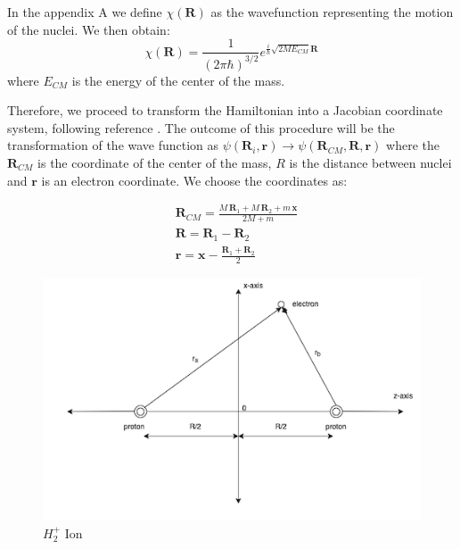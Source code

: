 In the appendix A we define $ \chi(\mathbf{R}) $ as the wavefunction representing the motion of the nuclei. We then  obtain:
\begin{equation}
\chi(\mathbf{R}) = \frac{1}{(2\pi\hbar)^{3/2}}e^{\frac{i}{\hbar}\sqrt{2ME_{CM}}\mathbf{R}}
\end{equation}
where $ E_{CM} $ is the energy of the center of the mass.

Therefore, we proceed to transform the Hamiltonian into a Jacobian coordinate system, following reference \cite{ZygelmanDalgarno1}. The outcome of this procedure will be the transformation of the wave function as $\psi(\mathbf{R}_i, \mathbf{r}) \rightarrow \psi(\mathbf{R}_{CM}, \mathbf{R}, \mathbf{r}) $ where the $ \mathbf{R}_{CM} $ is the coordinate of the center of the mass, $ R $ is the distance between nuclei and $ \mathbf{r} $ is an electron coordinate.
We choose the coordinates as:

\begin{equation}
\begin{split}
& \mathbf{R}_{CM} = \frac{M\,\mathbf{R}_1 + M\,\mathbf{R}_2 + m\,\mathbf{x}}{2M + m} \\[.8em]
& \mathbf{R} = \mathbf{R}_1 - \mathbf{R}_2 \\[.8em]
& \mathbf{r} = \mathbf{x} - \frac{\mathbf{R}_1 + \mathbf{R}_2}{2}
\end{split}
\end{equation}

\begin{figure}
    \noindent\includegraphics[width=\textwidth]{H2Ion3D-2.png}
    \caption{$ H_2^{+} $ Ion}\label{h2ion3d}
  \label{fig:electronCoordinates}
\end{figure}

